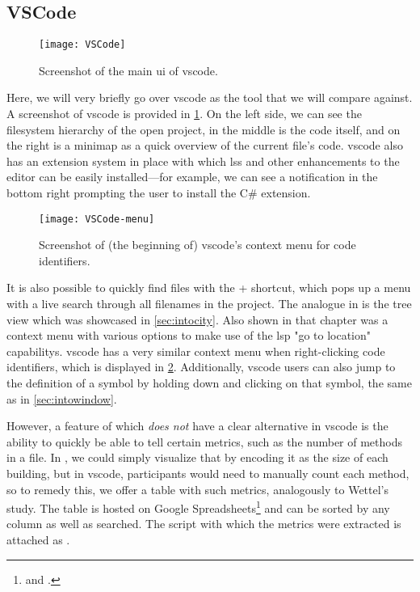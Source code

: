\documentclass[../thesis]{subfiles}
\begin{document}
\subsection{VSCode}\label{subsec:vscode}

\begin{figure}[htbp]
	\begin{center}
		\texttt{[image: VSCode]}
	\end{center}
	\caption{Screenshot of the main \gls{ui} of \gls{vscode}.}\label{fig:vscode}
\end{figure}

Here, we will very briefly go over \gls{vscode} as the tool that we will compare \SEE{} against.
A screenshot of \gls{vscode} is provided in \cref{fig:vscode}.
On the left side, we can see the filesystem hierarchy of the open project, in the middle is the code itself, and on the right is a minimap as a quick overview of the current file's code.
\gls{vscode} also has an extension system in place with which \glspl{ls} and other enhancements to the editor can be easily installed---for example, we can see a notification in the bottom right prompting the user to install the C\# extension.

\begin{figure}[htbp]
	\begin{center}
		\texttt{[image: VSCode-menu]}
	\end{center}
	\caption{Screenshot of (the beginning of) \gls{vscode}'s context menu for code identifiers.}\label{fig:vscode_menu}
\end{figure}

It is also possible to quickly find files with the  +  shortcut, which pops up a menu with a live search through all filenames in the project.
The analogue in \SEE{} is the tree view which was showcased in \cref{sec:intocity}.
Also shown in that chapter was a context menu with various options to make use of the \gls{lsp} "go to location" \glspl{capability}.
\Gls{vscode} has a very similar context menu when right-clicking code identifiers, which is displayed in \cref{fig:vscode_menu}.
Additionally, \gls{vscode} users can also jump to the definition of a symbol by holding down  and clicking on that symbol, the same as in \cref{sec:intowindow}.

However, a feature of \SEE{} which \emph{does not} have a clear alternative in \gls{vscode} is the ability to quickly be able to tell certain metrics, such as the number of methods in a file.
In \SEE{}, we could simply visualize that by encoding it as the size of each building, but in \gls{vscode}, participants would need to manually count each method, so to remedy this, we offer a table with such metrics, analogously to Wettel's study.
The table is hosted on Google Spreadsheets\footnote{
	 and .
} and can be sorted by any column as well as searched.
The script with which the metrics were extracted is attached as .
\end{document}
